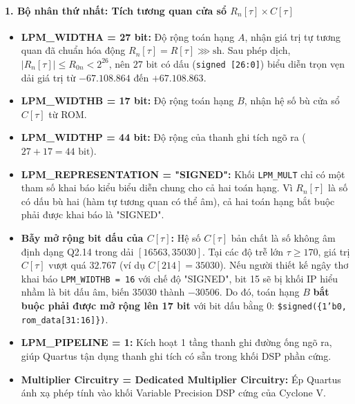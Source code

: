 \paragraph{1. Bộ nhân thứ nhất: Tích tương quan cửa sổ $R_n[\tau] \times C[\tau]$}
\begin{itemize}[leftmargin=1.5em, itemsep=2pt]
    \item \textbf{LPM\_WIDTHA = 27 bit:} Độ rộng toán hạng $A$, nhận giá trị tự tương quan đã chuẩn hóa động $R_n[\tau] = R[\tau] \ggg \text{sh}$. Sau phép dịch, $|R_n[\tau]| \le R_{0n} < 2^{26}$, nên $27\text{ bit}$ có dấu (\texttt{signed [26:0]}) biểu diễn trọn vẹn dải giá trị từ $-67.108.864$ đến $+67.108.863$.
    \item \textbf{LPM\_WIDTHB = 17 bit:} Độ rộng toán hạng $B$, nhận hệ số bù cửa sổ $C[\tau]$ từ ROM.
    \item \textbf{LPM\_WIDTHP = 44 bit:} Độ rộng của thanh ghi tích ngõ ra ($27 + 17 = 44\text{ bit}$).
    \item \textbf{LPM\_REPRESENTATION = "SIGNED":} Khối \texttt{LPM\_MULT} chỉ có một tham số khai báo kiểu biểu diễn chung cho cả hai toán hạng. Vì $R_n[\tau]$ là số có dấu bù hai (hàm tự tương quan có thể âm), cả hai toán hạng bắt buộc phải được khai báo là "SIGNED".
    \item \textbf{Bẫy mở rộng bit dấu của $C[\tau]$:} Hệ số $C[\tau]$ bản chất là số không âm định dạng Q2.14 trong dải $[16563, 35030]$. Tại các độ trễ lớn $\tau \ge 170$, giá trị $C[\tau]$ vượt quá $32.767$ (ví dụ $C[214] = 35030$). Nếu người thiết kế ngây thơ khai báo \texttt{LPM\_WIDTHB = 16} với chế độ "SIGNED", bit 15 sẽ bị khối IP hiểu nhầm là bit dấu âm, biến $35030$ thành $-30506$. Do đó, toán hạng $B$ \textbf{bắt buộc phải được mở rộng lên 17 bit} với bit dấu bằng 0: \texttt{\$signed(\{1'b0, rom\_data[31:16]\})}.
    \item \textbf{LPM\_PIPELINE = 1:} Kích hoạt 1 tầng thanh ghi đường ống ngõ ra, giúp Quartus tận dụng thanh ghi tích có sẵn trong khối DSP phần cứng.
    \item \textbf{Multiplier Circuitry = Dedicated Multiplier Circuitry:} Ép Quartus ánh xạ phép tính vào khối Variable Precision DSP cứng của Cyclone V.
\end{itemize}


